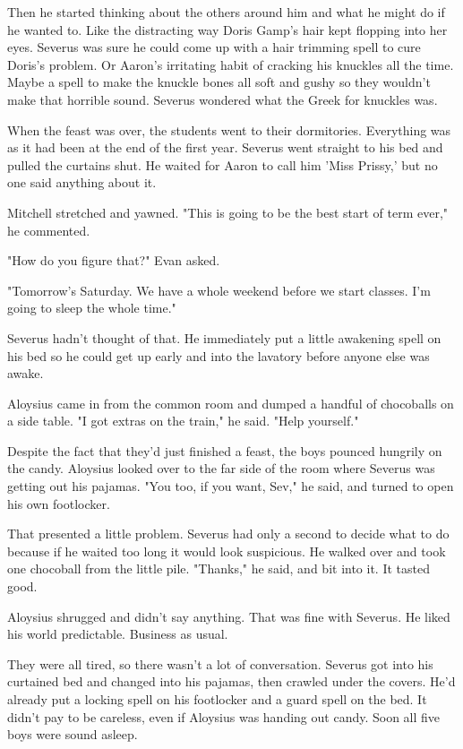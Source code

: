 \documentclass[a4paper,11pt]{article}
\begin{document}
Then he started thinking about the others around him and what he might do if he wanted to. Like the distracting way Doris Gamp's hair kept flopping into her eyes. Severus was sure he could come up with a hair trimming spell to cure Doris's problem. Or Aaron's irritating habit of cracking his knuckles all the time. Maybe a spell to make the knuckle bones all soft and gushy so they wouldn't make that horrible sound. Severus wondered what the Greek for knuckles was.

When the feast was over, the students went to their dormitories. Everything was as it had been at the end of the first year. Severus went straight to his bed and pulled the curtains shut. He waited for Aaron to call him 'Miss Prissy,' but no one said anything about it.

Mitchell stretched and yawned. "This is going to be the best start of term ever," he commented.

"How do you figure that?" Evan asked.

"Tomorrow's Saturday. We have a whole weekend before we start classes. I'm going to sleep the whole time."

Severus hadn't thought of that. He immediately put a little awakening spell on his bed so he could get up early and into the lavatory before anyone else was awake.

Aloysius came in from the common room and dumped a handful of chocoballs on a side table. "I got extras on the train," he said. "Help yourself."

Despite the fact that they'd just finished a feast, the boys pounced hungrily on the candy. Aloysius looked over to the far side of the room where Severus was getting out his pajamas. "You too, if you want, Sev," he said, and turned to open his own footlocker.

That presented a little problem. Severus had only a second to decide what to do because if he waited too long it would look suspicious. He walked over and took one chocoball from the little pile. "Thanks," he said, and bit into it. It tasted good.

Aloysius shrugged and didn't say anything. That was fine with Severus. He liked his world predictable. Business as usual.

They were all tired, so there wasn't a lot of conversation. Severus got into his curtained bed and changed into his pajamas, then crawled under the covers. He'd already put a locking spell on his footlocker and a guard spell on the bed. It didn't pay to be careless, even if Aloysius was handing out candy. Soon all five boys were sound asleep.
\end{document}
